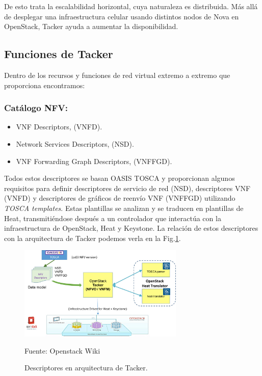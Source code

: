 De esto trata la escalabilidad horizontal, cuya naturaleza es distribuida. Más allá de desplegar una infraestructura celular usando distintos nodos de Nova en OpenStack, Tacker ayuda a aumentar la disponibilidad. 

\subsection{Funciones de Tacker}
Dentro de los recursos y funciones de red virtual extremo a extremo que proporciona encontramos: 

\subsubsection{Catálogo NFV:} 
\begin{itemize}
\item VNF Descriptors, (VNFD).
\item Network Services Descriptors, (NSD).
\item VNF Forwarding Graph Descriptors, (VNFFGD).
\end{itemize}

Todos estos descriptores se basan OASIS TOSCA \cite{noauthor_tosca_nodate} y proporcionan algunos requisitos para definir descriptores de servicio de red (NSD), descriptores VNF (VNFD) y descriptores de gráficos de reenvío VNF (VNFFGD) utilizando \textit{TOSCA templates}. Estas plantillas se analizan y se traducen en plantillas de Heat, transmitiéndose después a un controlador que interactúa con la infraestructura de OpenStack, Heat y Keystone. La relación de estos descriptores con la arquitectura de Tacker podemos verla en la Fig.\ref{TackerArquitecturaDescriptores}.

\begin{figure}
    \centering
    \includegraphics[width=0.7\textwidth]{imagenes/capitulo4/DescriptoresTacker.png}
    \caption{Descriptores en arquitectura de Tacker.}
	\vspace{0.3cm}
    \footnotesize{Fuente: Openstack Wiki}
    \label{TackerArquitecturaDescriptores}
\end{figure}

